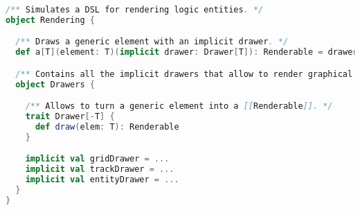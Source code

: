 \begin{lstlisting}[label=code:rendering, language=Scala, caption=Implementazione della \textit{dsl} \texttt{Rendering}]
/** Simulates a DSL for rendering logic entities. */
object Rendering {

  /** Draws a generic element with an implicit drawer. */
  def a[T](element: T)(implicit drawer: Drawer[T]): Renderable = drawer.draw(element)

  /** Contains all the implicit drawers that allow to render graphical elements. */
  object Drawers {

    /** Allows to turn a generic element into a [[Renderable]]. */
    trait Drawer[-T] {
      def draw(elem: T): Renderable
    }

    implicit val gridDrawer = ...
    implicit val trackDrawer = ...
    implicit val entityDrawer = ...
  }
}
\end{lstlisting}